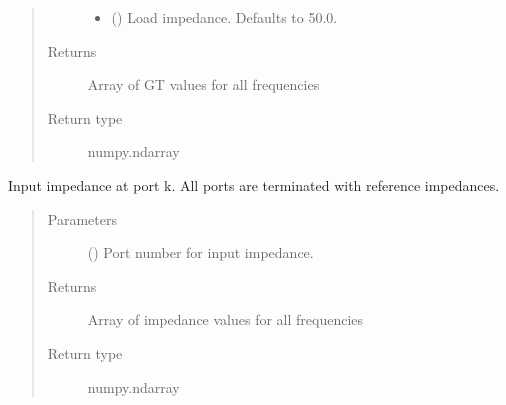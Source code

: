 \documentclass[letterpaper,10pt,english]{sphinxmanual}
\begin{document}
\begin{fulllineitems}
\begin{fulllineitems}
\begin{quote}
\begin{description}
\begin{itemize}
\item {} 
 (\sphinxstyleliteralemphasis{\sphinxupquote{, }}) \textendash{} Load impedance. Defaults to 50.0.

\end{itemize}

\item[{Returns}] \leavevmode
Array of GT values for all frequencies

\item[{Return type}] \leavevmode
numpy.ndarray

\end{description}\end{quote}

\end{fulllineitems}


\begin{fulllineitems}
\label{\detokenize{touchstone:touchstone.spfile.input_impedance}}
Input impedance at port k. All ports are terminated with reference impedances.
\begin{quote}\begin{description}
\item[{Parameters}] \leavevmode
{} () \textendash{} Port number for input impedance.

\item[{Returns}] \leavevmode
Array of impedance values for all frequencies

\item[{Return type}] \leavevmode
numpy.ndarray

\end{description}\end{quote}

\end{fulllineitems}



\end{fulllineitems}
\end{document}
